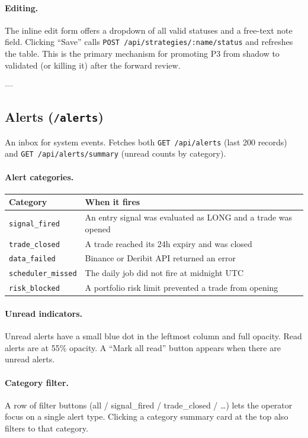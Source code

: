 \documentclass[12pt, a4paper]{article}
\begin{document}
\paragraph{Editing.}
The inline edit form offers a dropdown of all valid statuses and a free-text
note field. Clicking ``Save'' calls \texttt{POST /api/strategies/:name/status}
and refreshes the table. This is the primary mechanism for promoting P3 from
shadow to validated (or killing it) after the forward review.

---

\subsection{Alerts (\texttt{/alerts})}

An inbox for system events. Fetches both \texttt{GET /api/alerts} (last 200
records) and \texttt{GET /api/alerts/summary} (unread counts by category).

\paragraph{Alert categories.}
\begin{table}[H]
\centering\small
\begin{tabular}{ll}
\toprule
Category & When it fires \\
\midrule
\texttt{signal\_fired}     & An entry signal was evaluated as LONG and a trade was opened \\
\texttt{trade\_closed}     & A trade reached its 24h expiry and was closed \\
\texttt{data\_failed}      & Binance or Deribit API returned an error \\
\texttt{scheduler\_missed} & The daily job did not fire at midnight UTC \\
\texttt{risk\_blocked}     & A portfolio risk limit prevented a trade from opening \\
\bottomrule
\end{tabular}
\end{table}

\paragraph{Unread indicators.}
Unread alerts have a small blue dot in the leftmost column and full opacity.
Read alerts are at 55\% opacity. A ``Mark all read'' button appears when
there are unread alerts.

\paragraph{Category filter.}
A row of filter buttons (all / signal\_fired / trade\_closed / \ldots) lets
the operator focus on a single alert type. Clicking a category summary card
at the top also filters to that category.
\end{document}
